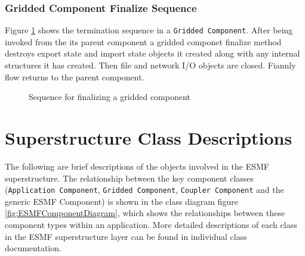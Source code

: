 \subsubsection{Gridded Component Finalize Sequence}
Figure \ref{fig:GriddedComponentFinalizeSequence} shows the termination 
sequence in a {\tt Gridded Component}. After being invoked from the
its parent component a gridded componet finalize method destroys
export state and import state objects it created along with any
internal structures it has created. Then file and network I/O objects
are closed. Fiannly flow returns to the parent component.
\begin{figure}
\caption[{Gridded Component Finalize}]{Sequence for finalizing a gridded component}
\label{fig:GriddedComponentFinalizeSequence}
\end{figure}

\section{Superstructure Class Descriptions}

The following are brief descriptions of the objects involved in the
ESMF superstructure. The relationship between the key component classes
({\tt Application Component}, {\tt Gridded Component}, {\tt Coupler Component} and the generic ESMF Component)
is shown in the 
class diagram figure \ref{fig:ESMFComponentDiagram}, which shows the relationships between these component 
types within an application. More detailed descriptions of each class 
in the ESMF superstructure layer can be found in individual class documentation.

